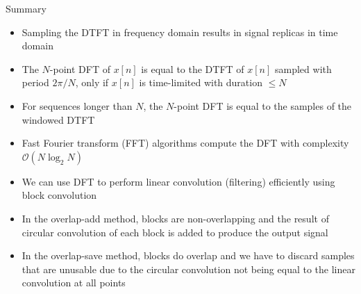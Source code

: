\documentclass[10pt]{beamer}
\begin{document}
%
\begin{frame}{Summary}
	\begin{itemize}
		\item Sampling the DTFT in frequency domain results in signal replicas in time domain
		\item The $N$-point DFT of $x[n]$ is equal to the DTFT of $x[n]$ sampled with period $2\pi/N$, only if $x[n]$ is time-limited with duration $\leq N$
		\item For sequences longer than $N$, the $N$-point DFT is equal to the samples of the windowed DTFT
		\item Fast Fourier transform (FFT) algorithms compute the DFT with complexity $\mathcal{O}(N\log_2 N)$
		\item We can use DFT to perform linear convolution (filtering) efficiently using block convolution
		\item In the overlap-add method, blocks are non-overlapping and the result of circular convolution of each block is added to produce the output signal
		\item In the overlap-save method, blocks do overlap and we have to discard samples that are unusable due to the circular convolution not being equal to the linear convolution at all points
	\end{itemize}
\end{frame}
\end{document}

